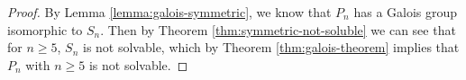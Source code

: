 \begin{proof}
	By Lemma \ref{lemma:galois-symmetric}, we know that $P_n$ has a Galois group isomorphic to $S_n$. Then by Theorem \ref{thm:symmetric-not-soluble} we can see that for $n \geq 5$, $S_n$ is not solvable, which by Theorem \ref{thm:galois-theorem} implies that $P_n$ with $n \ge 5$ is not solvable.
\end{proof}

%
%
%
%
%
%
%
%
%
%
%
